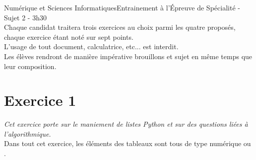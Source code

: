 \documentclass[11pt,a4paper,french,twoside]{PMCours}
\begin{document}
{Numérique et Sciences Informatiques}{Entrainement à l'\'Epreuve de Spécialité - Sujet 2 - 3h30}
\ \medskip\\
{\large Chaque candidat traitera trois exercices au choix parmi les quatre proposés, chaque exercice étant noté sur sept points.\medskip\\
L'usage de tout document, calculatrice, etc... est interdit. \medskip\\
Les élèves rendront de manière impérative brouillons et sujet en même temps que leur composition.}


%
%
%
%
\newpage\noindent
\section*{Exercice 1}
\emph{Cet exercice porte sur le maniement de listes Python et sur des questions liées à l'algorithmique.}\medskip\\
Dans tout cet exercice, les éléments des tableaux sont tous de type numérique  ou .
\end{document}
